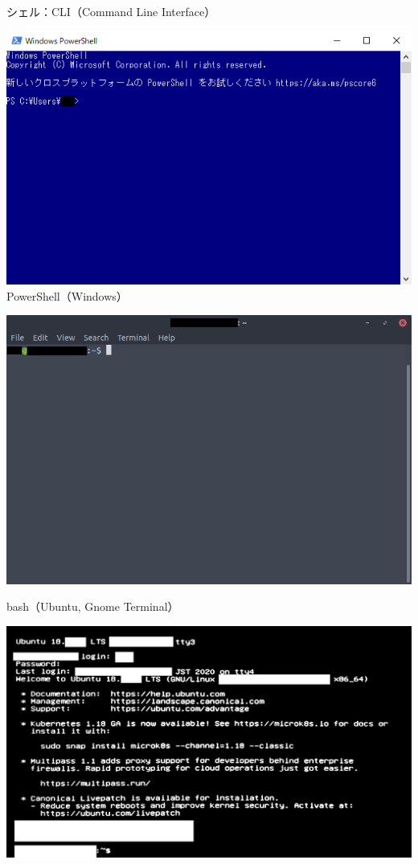 \documentclass[12pt,aspectratio=169]{beamer}
\begin{document}
\begin{frame}{シェル：CLI（Command Line Interface）}
\begin{minipage}{0.3\textwidth}
    \includegraphics[width=1.2\linewidth,bb=0 0 620 388]{./images/powershell.png}
    PowerShell（Windows）
  \end{minipage}
  \hfill
  \begin{minipage}{0.3\textwidth}
    \includegraphics[width=\linewidth,bb=0 0 734 487]{./images/ubuntu-gnome.png}
    \begin{flushleft} \small bash（Ubuntu, Gnome Terminal） \end{flushleft}
    \includegraphics[width=\linewidth,bb=0 0 1262 721]{./images/ubuntu-cli.jpg}

\end{minipage}
\end{frame}
\end{document}
